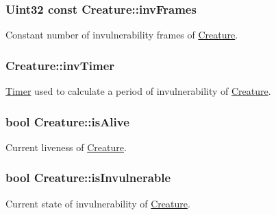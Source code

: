 \subsubsection[{\texorpdfstring{inv\+Frames}{invFrames}}]{\setlength{\rightskip}{0pt plus 5cm}Uint32 const Creature\+::inv\+Frames\hspace{0.3cm}{\ttfamily [protected]}}\hypertarget{class_creature_a430d7d130b9a4466faf8850322831671}{}\label{class_creature_a430d7d130b9a4466faf8850322831671}
Constant number of invulnerability frames of \hyperlink{class_creature}{Creature}. 
\subsubsection[{\texorpdfstring{inv\+Timer}{invTimer}}]{ Creature\+::inv\+Timer\hspace{0.3cm}{\ttfamily [protected]}}\hypertarget{class_creature_aeda246cf3c5e6025c91a02b72d4561ee}{}\label{class_creature_aeda246cf3c5e6025c91a02b72d4561ee}
\hyperlink{class_timer}{Timer} used to calculate a period of invulnerability of \hyperlink{class_creature}{Creature}. 
\subsubsection[{\texorpdfstring{is\+Alive}{isAlive}}]{\setlength{\rightskip}{0pt plus 5cm}bool Creature\+::is\+Alive\hspace{0.3cm}{\ttfamily [protected]}}\hypertarget{class_creature_a346917307824f74d66ed73751c32f4a2}{}\label{class_creature_a346917307824f74d66ed73751c32f4a2}
Current liveness of \hyperlink{class_creature}{Creature}. 
\subsubsection[{\texorpdfstring{is\+Invulnerable}{isInvulnerable}}]{\setlength{\rightskip}{0pt plus 5cm}bool Creature\+::is\+Invulnerable\hspace{0.3cm}{\ttfamily [protected]}}\hypertarget{class_creature_a5aaf90f9ca19a84d1b66016df689a735}{}\label{class_creature_a5aaf90f9ca19a84d1b66016df689a735}
Current state of invulnerability of \hyperlink{class_creature}{Creature}. 
